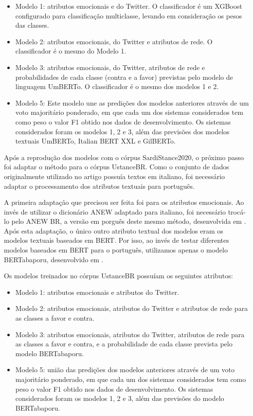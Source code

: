 \documentclass[
	12pt, oneside, a4paper, english, brazil
]{abntex2ppgsi}
\begin{document}
\begin{itemize}
  \item Modelo 1: atributos emocionais e do Twitter. O classificador é um XGBoost configurado para classificação multiclasse, levando em consideração os pesos das classes.
  \item Modelo 2: atributos emocionais, do Twitter e atributos de rede. O classificador é o mesmo do Modelo 1.
  \item Modelo 3: atributos emocionais, do Twitter, atributos de rede e probabilidades de cada classe (contra e a favor) previstas pelo modelo de linguagem UmBERTo. O classificador é o mesmo dos modelos 1 e 2.
  \item Modelo 5: Este modelo une as predições dos modelos anteriores através de um voto majoritário ponderado, em que cada um dos sistemas considerados tem como peso o valor F1 obtido nos dados de desenvolvimento. Os sistemas considerados foram os modelos 1, 2 e 3, além das previsões dos modelos textuais UmBERTo, Italian BERT XXL e GilBERTo.
\end{itemize}

Após a reprodução dos modelos com o córpus SardiStance2020, o próximo passo foi adaptar o método para o córpus UstanceBR. Como o conjunto de dados originalmente utilizado no artigo possuía textos em italiano, foi necessário adaptar o processamento dos atributos textuais para português. 

A primeira adaptação que precisou ser feita foi para os atributos emocionais. Ao invés de utilizar o dicionário ANEW adaptado para italiano, foi necessário trocá-lo pelo ANEW BR, a versão em porguês deste mesmo método, desenvolvida em . Após esta adaptação, o único outro atributo textual dos modelos eram os modelos textuais baseados em BERT. Por isso, ao invés de testar diferentes modelos baseados em BERT para o português, utilizamos apenas o modelo BERTabaporu, desenvolvido em .

Os modelos treinados no córpus UstanceBR possuíam os seguintes atributos:

\begin{itemize}
  \item Modelo 1: atributos emocionais e atributos do Twitter.
  \item Modelo 2: atributos emocionais, atributos do Twitter e atributos de rede para as classes a favor e contra.
  \item Modelo 3: atributos emocionais, atributos do Twitter, atributos de rede para as classes a favor e contra, e a probabilidade de cada classe prevista pelo modelo BERTabaporu.
  \item Modelo 5: união das predições dos modelos anteriores através de um voto majoritário ponderado, em que cada um dos sistemas considerados tem como peso o valor F1 obtido nos dados de desenvolvimento. Os sistemas considerados foram os modelos 1, 2 e 3, além das previsões do modelo BERTabaporu.
\end{itemize}
\end{document}
